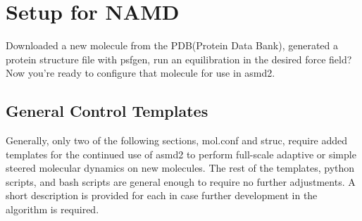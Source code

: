 \documentclass[11pt]{article}
\begin{document}
\section{Setup for NAMD}
Downloaded a new molecule from the PDB(Protein Data Bank), generated a protein structure file  with psfgen, run an equilibration in the desired force field?
Now you're ready to configure that molecule for use in asmd2.
\subsection{General Control Templates}
Generally, only two of the following sections, mol.conf and struc, require added templates for the continued use of asmd2 to perform full-scale adaptive or simple steered molecular dynamics on new molecules. The rest of the templates, python scripts, and bash scripts are general enough to require no further adjustments. A short description is provided for each in case further development in the algorithm is required.
\end{document}
